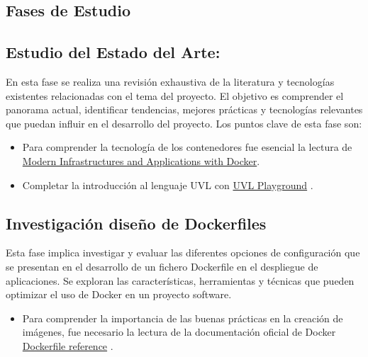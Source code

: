 \documentclass[12pt, a4paper, twoside]{article}
\begin{document}
\subsection{Fases de Estudio}

\subsection{Estudio del Estado del Arte:}
En esta fase se realiza una revisión exhaustiva de la literatura y tecnologías existentes relacionadas con el tema del 
proyecto. El objetivo es comprender el panorama actual, identificar tendencias, mejores prácticas y tecnologías 
relevantes que puedan influir en el desarrollo del proyecto. Los puntos clave de esta fase son:

\begin{itemize}
	\item Para comprender la tecnología de los contenedores fue esencial la lectura de \href{https://www.oreilly.com/library/view/docker-certified-associate/9781839211898/c5ecd7bc-b7ed-4303-89a8-e487c6a220ed.xhtml#uuid-1a5da664-fb76-4e56-bdb0-83255dde9e78}{Modern Infrastructures and Applications with Docker}. \cite{docker_certified_associate}
	\item Completar la introducción al lenguaje UVL con \href{https://uvl.uni-ulm.de/}{UVL Playground} \cite{uvl_playground}.
\end{itemize}

\subsection{Investigación diseño de Dockerfiles}
Esta fase implica investigar y evaluar las diferentes opciones de configuración que se presentan en el desarrollo de un fichero Dockerfile en el 
despliegue de aplicaciones. Se exploran las características, herramientas y técnicas que pueden optimizar el uso de 
Docker en un proyecto software. 

\begin{itemize}
	\item Para comprender la importancia de las buenas prácticas en la creación de imágenes, fue necesario la lectura de la documentación oficial de Docker \href{https://docs.docker.com/reference/Dockerfile/}{Dockerfile reference} \cite{dockerfile_reference}.
\end{itemize}
\end{document}
